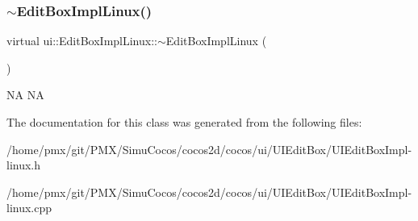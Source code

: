 \subsubsection{\texorpdfstring{$\sim$\+Edit\+Box\+Impl\+Linux()}{~EditBoxImplLinux()}\hspace{0.1cm}{\footnotesize\ttfamily [2/2]}}
{\footnotesize\ttfamily virtual ui\+::\+Edit\+Box\+Impl\+Linux\+::$\sim$\+Edit\+Box\+Impl\+Linux (\begin{DoxyParamCaption}{ }\end{DoxyParamCaption})\hspace{0.3cm}{\ttfamily [virtual]}}

NA  NA 

The documentation for this class was generated from the following files\+:\begin{DoxyCompactItemize}
\item 
/home/pmx/git/\+P\+M\+X/\+Simu\+Cocos/cocos2d/cocos/ui/\+U\+I\+Edit\+Box/U\+I\+Edit\+Box\+Impl-\/linux.\+h\item 
/home/pmx/git/\+P\+M\+X/\+Simu\+Cocos/cocos2d/cocos/ui/\+U\+I\+Edit\+Box/U\+I\+Edit\+Box\+Impl-\/linux.\+cpp\end{DoxyCompactItemize}
